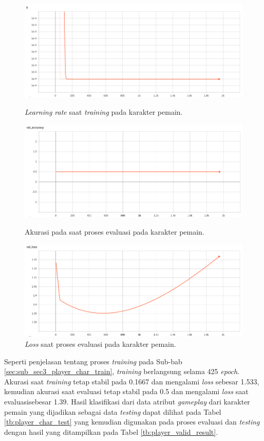 \begin{figure} [!h] \centering
	\includegraphics[scale=0.44]{img/player_lr_chap4.png}
	\caption{\textit{Learning rate} saat \textit{training} pada karakter pemain.}
	\label{fig:nn_player_lr_chap4}
	\vspace{4ex}
	
	\includegraphics[scale=0.44]{img/player_val_acc_chap4.png}
	\caption{Akurasi pada saat proses evaluasi pada karakter pemain.}
	\label{fig:nn_player_val_acc_chap4}
	\vspace{4ex}
	
	\includegraphics[scale=0.44]{img/player_val_loss_chap4.png}
	\caption{\textit{Loss} saat proses evaluasi pada karakter pemain.}
	\label{fig:nn_player_val_loss_chap4}
\end{figure}
\clearpage

Seperti penjelasan tentang proses \textit{training} pada Sub-bab \ref{sec:sub_sec3_player_char_train}, \textit{training} berlangsung selama 425 \textit{epoch}. Akurasi saat \textit{training} tetap stabil pada 0.1667 dan mengalami \textit{loss} sebesar 1.533, kemudian akurasi saat evaluasi tetap stabil pada 0.5 dan mengalami \textit{loss} saat evaluasisebesar 1.39. Hasil klasifikasi dari data atribut \textit{gameplay} dari karakter pemain yang dijadikan sebagai data \textit{testing} dapat dilihat pada Tabel \ref{tb:player_char_test} yang kemudian digunakan pada proses evaluasi dan \textit{testing} dengan hasil yang ditampilkan pada Tabel \ref{tb:player_valid_result}.
\vspace{-1ex}

